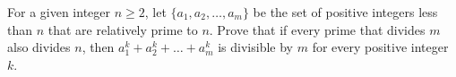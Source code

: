 For a given integer $n\ge 2$,  let $\{a_1,a_2,…,a_m\}$ be the set of positive integers less than $n$ that are relatively prime to $n$. Prove that if every prime that divides $m$ also divides $n$,  then $a_1^k+a_2^k + \dots + a_m^k$ is divisible by $m$ for every positive integer $k$.